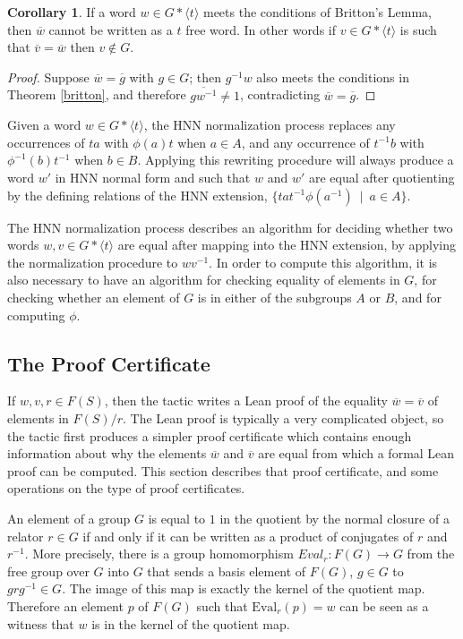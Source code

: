\documentclass[12pt]{article} %
\theoremstyle{definition}
\theoremstyle{definition}
\newtheorem{corol}{Corollary}[theorem]
\theoremstyle{definition}
\theoremstyle{definition}
\theoremstyle{definition}
\theoremstyle{definition}
\begin{document}
\begin{corol}\label{genbritton}
  If a word $w \in G \ast \langle t \rangle$ meets the conditions of Britton's Lemma,
  then $\overline{w}$ cannot be written as a $t$ free word.
  In other words if $v \in G \ast \langle t \rangle$ is such that
  $\overline{v} = \overline{w}$ then $v \notin G$.
\end{corol}
\begin{proof}
Suppose $\overline{w} = \overline{g}$ with $g \in G$;
then $g^{-1}w$ also meets the conditions
in Theorem \ref{britton}, and therefore
$\overline{gw^{-1}} \ne 1$, contradicting $\overline{w} = \overline{g}$.
\end{proof}
Given a word $w \in G \ast \langle t \rangle$, the HNN normalization process
replaces any occurrences of $ta$ with $\phi(a)t$ when $a \in A$, and
any occurrence of $t^{-1}b$ with $\phi^{-1}(b)t^{-1}$ when $b \in B$.
Applying this rewriting procedure will always produce a word $w'$ in HNN normal form and
such that $w$ and $w'$ are equal after quotienting by the defining relations
of the HNN extension, $\{ta t^{-1} \phi(a^{-1}) \ \mid \  a \in A\}$.

The HNN normalization process describes an algorithm for deciding
whether two words $w, v \in G \ast \langle t \rangle$ are equal
after mapping into the HNN extension, by applying the normalization procedure to
 $wv^{-1}$.
In order to compute this algorithm, it is also necessary to have an algorithm for checking equality
of elements in $G$,
for checking whether an element of $G$ is in either of the subgroups $A$ or $B$, and for computing $\phi$.

\subsection{The Proof Certificate}\label{proofcert}

If $w, v, r \in F(S)$, then the tactic writes a Lean proof of the equality
$\overline{w} = \overline{v}$ of elements in $F(S) / r$. The Lean proof is typically
a very complicated object, so the tactic first produces a simpler proof certificate which
contains enough information about why the elements $\overline{w}$ and $\overline{v}$ are equal
from which a formal Lean proof can be computed. This section describes that proof certificate,
and some operations on the type of proof certificates.

An element of a group $G$ is equal to $1$ in the quotient by the normal closure
of a relator $r \in G$ if and only if it can be written as a product of conjugates of
$r$ and $r^{-1}$.
More precisely, there is a group homomorphism $\textit{Eval}_r : F(G) \to G$ from the free group
over $G$ into $G$ that sends a basis element of $F(G)$,
$g \in G$ to $grg^{-1} \in G$. The image of this map is exactly the kernel of the quotient map.
Therefore an element $p$ of $F(G)$ such that $\text{Eval}_r(p) = w$
can be seen as a witness that $w$ is in the kernel of the quotient map.
\end{document}
